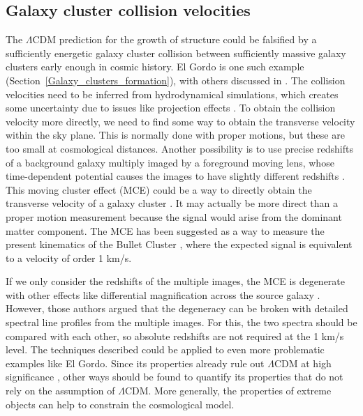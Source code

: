 \documentclass[fleqn,usenatbib,useAMS]{mnras} %
\begin{document}
\subsection{Galaxy cluster collision velocities}
\label{Galaxy_cluster_vtan}

The $\Lambda$CDM prediction for the growth of structure could be falsified by a sufficiently energetic galaxy cluster collision between sufficiently massive galaxy clusters early enough in cosmic history. El Gordo is one such example (Section~\ref{Galaxy_clusters_formation}), with others discussed in \citet{Asencio_2021}. The collision velocities need to be inferred from hydrodynamical simulations, which creates some uncertainty due to issues like projection effects \citep{Molnar_2013_A1750}. To obtain the collision velocity more directly, we need to find some way to obtain the transverse velocity within the sky plane. This is normally done with proper motions, but these are too small at cosmological distances. Another possibility is to use precise redshifts of a background galaxy multiply imaged by a foreground moving lens, whose time-dependent potential causes the images to have slightly different redshifts \citep{Birkinshaw_1983}. This moving cluster effect (MCE) could be a way to directly obtain the transverse velocity of a galaxy cluster \citep{Molnar_2003}. It may actually be more direct than a proper motion measurement because the signal would arise from the dominant matter component. The MCE has been suggested as a way to measure the present kinematics of the Bullet Cluster \citep{Molnar_2013_MCE}, where the expected signal is equivalent to a velocity of order 1 km/s.

If we only consider the redshifts of the multiple images, the MCE is degenerate with other effects like differential magnification across the source galaxy \citep{Banik_2015}. However, those authors argued that the degeneracy can be broken with detailed spectral line profiles from the multiple images. For this, the two spectra should be compared with each other, so absolute redshifts are not required at the 1 km/s level. The techniques described could be applied to even more problematic examples like El Gordo. Since its properties already rule out $\Lambda$CDM at high significance \citep{Asencio_2021}, other ways should be found to quantify its properties that do not rely on the assumption of $\Lambda$CDM. More generally, the properties of extreme objects can help to constrain the cosmological model.
\end{document}
